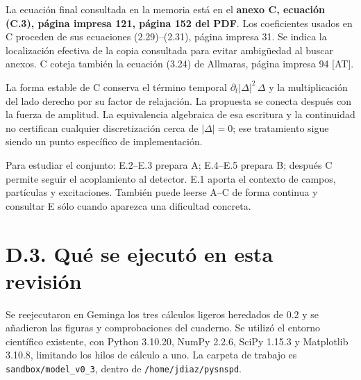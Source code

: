 \documentclass[
  spanish,
  10pt,
  a4paper,
]{article}
\begin{document}
La ecuación final consultada en la memoria está en el \textbf{anexo C,
ecuación (C.3), página impresa 121, página 152 del PDF}. Los
coeficientes usados en C proceden de sus ecuaciones (2.29)--(2.31),
página impresa 31. Se indica la localización efectiva de la copia
consultada para evitar ambigüedad al buscar anexos. C coteja también la
ecuación (3.24) de Allmaras, página impresa 94 {[}AT{]}.

La forma estable de C conserva el término temporal
\(\partial_t|\Delta|^2\,\Delta\) y la multiplicación del lado derecho
por su factor de relajación. La propuesta se conecta después con la
fuerza de amplitud. La equivalencia algebraica de esa escritura y la
continuidad no certifican cualquier discretización cerca de
\(|\Delta|=0\); ese tratamiento sigue siendo un punto específico de
implementación.

Para estudiar el conjunto: E.2--E.3 prepara A; E.4--E.5 prepara B;
después C permite seguir el acoplamiento al detector. E.1 aporta el
contexto de campos, partículas y excitaciones. También puede leerse A--C
de forma continua y consultar E sólo cuando aparezca una dificultad
concreta.

\section{D.3. Qué se ejecutó en esta
revisión}\label{d.3.-quuxe9-se-ejecutuxf3-en-esta-revisiuxf3n}

Se reejecutaron en Geminga los tres cálculos ligeros heredados de 0.2 y
se añadieron las figuras y comprobaciones del cuaderno. Se utilizó el
entorno científico existente, con Python 3.10.20, NumPy 2.2.6, SciPy
1.15.3 y Matplotlib 3.10.8, limitando los hilos de cálculo a uno. La
carpeta de trabajo es \nolinkurl{sandbox/model_v0_3}, dentro de
\nolinkurl{/home/jdiaz/pysnspd}.
\end{document}
